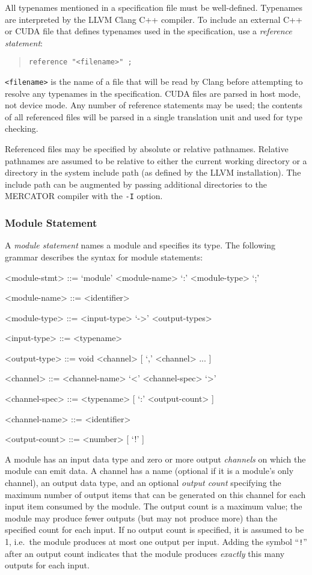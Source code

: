 \documentclass[11pt]{article}
\begin{document}
All typenames mentioned in a specification file must be well-defined.
Typenames are interpreted by the LLVM Clang C++ compiler.  To include
an external C++ or CUDA file that defines typenames used in the
specification, use a \textit{reference statement}:
\begin{quote}
\texttt{reference "<filename>" ;}
\end{quote}
\texttt{<filename>} is the name of a file that will be read by Clang before
attempting to resolve any typenames in the specification.  CUDA files
are parsed in host mode, not device mode.  Any number of reference
statements may be used; the contents of all referenced files will be
parsed in a single translation unit and used for type checking.

Referenced files may be specified by absolute or relative pathnames.
Relative pathnames are assumed to be relative to either the current
working directory or a directory in the system include path (as
defined by the LLVM installation).  The include path can be augmented
by passing additional directories to the MERCATOR compiler with
the \texttt{-I} option.

\subsubsection{Module Statement}

A \textit{module statement} names a module and specifies its type.
The following grammar describes the syntax for module statements:
\begin{grammar}

<module-stmt> ::= `module' <module-name> `:' <module-type> `;'

<module-name> ::= <identifier>

<module-type> ::= <input-type> `->' <output-types>

<input-type> ::= <typename>

<output-type> ::= void
\alt <channel> [ `,' <channel> ... ]

<channel> ::= <channel-name> `<' <channel-spec> `>'

<channel-spec> ::= <typename> [ `:' <output-count> ]

<channel-name> ::= <identifier>

<output-count> ::= <number> [ `!' ]

\end{grammar}

A module has an input data type and zero or more output
\emph{channels} on which the module can emit data.  A channel has a
name (optional if it is a module's only channel), an output data type,
and an optional \emph{output count} specifying the maximum number of
output items that can be generated on this channel for each input item
consumed by the module.  The output count is a maximum value; the
module may produce fewer outputs (but may not produce more) than the
specified count for each input.  If no output count is specified, it
is assumed to be 1, i.e.\ the module produces at most one output per
input.  Adding the symbol ``\texttt{!}''  after an output count
indicates that the module produces \emph{exactly} this many outputs
for each input.
\end{document}
